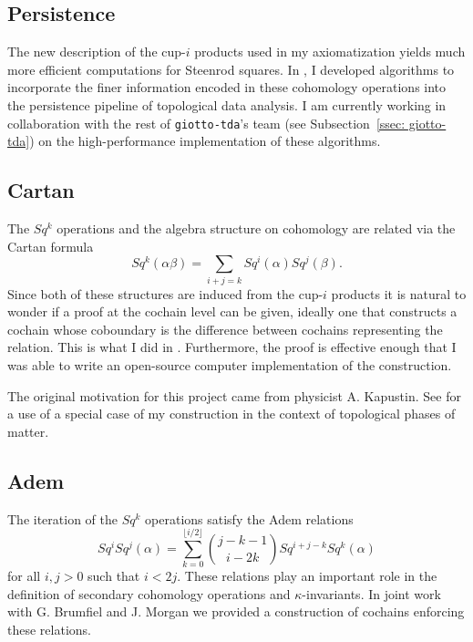 \subsection{Persistence}
The new description of the cup-$i$ products used in my axiomatization \cite{medina2018axiomatic} yields much more efficient computations for Steenrod squares. In \cite{medina2018persistence}, I developed algorithms to incorporate the finer information encoded in these cohomology operations into the persistence pipeline of topological data analysis. I am currently working in collaboration with the rest of \texttt{giotto-tda}'s team (see Subsection~\ref{ssec: giotto-tda}) on the high-performance implementation of these algorithms.

\subsection{Cartan}
The $Sq^k$ operations and the algebra structure on cohomology are related via the Cartan formula
\begin{equation*}
Sq^k(\alpha \beta) = \sum_{i+j=k} Sq^i(\alpha) Sq^j(\beta).
\end{equation*}
Since both of these structures are induced from the cup-$i$ products it is natural to wonder if a proof at the cochain level can be given, ideally one that constructs a cochain whose coboundary is the difference between cochains representing the relation. This is what I did in \cite{medina2020cartan}. Furthermore, the proof is effective enough that I was able to write an open-source computer implementation of the construction.

The original motivation for this project came from physicist A. Kapustin. See \cite{kapustin2017fermionic} for a use of a special case of my construction in the context of topological phases of matter.

\subsection{Adem}
The iteration of the $Sq^k$ operations satisfy the Adem relations
\begin{equation*}
Sq^i Sq^j(\alpha) = \sum_{k=0}^{\lfloor i/2 \rfloor} \binom{j-k-1}{i-2k} Sq^{i+j-k} Sq^k(\alpha)
\end{equation*}
for all $i,j>0$ such that $i< 2j$. These relations play an important role in the definition of secondary cohomology operations and $\kappa$-invariants. In joint work with G. Brumfiel and J. Morgan \cite{medina2021adem} we provided a construction of cochains enforcing these relations.

